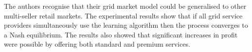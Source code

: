 The authors recognise that their grid market model could be generalised to
other multi-seller retail markets.  The experimental results show that if
all grid service providers simultaneously use the learning algorithm then the
process converges to a Nash equilibrium.  The results also showed that
significant increases in profit were possible by offering both standard and
premium services.


%
%

